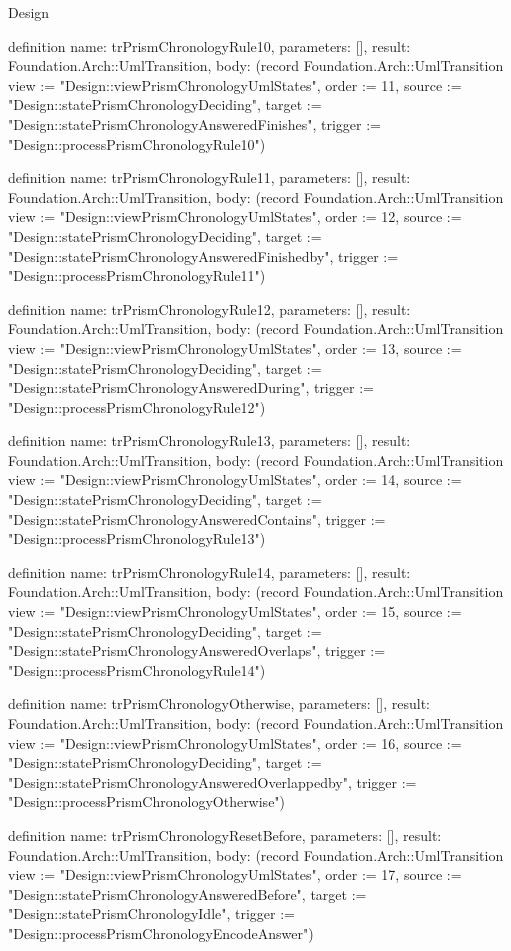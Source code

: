 \begin{lexlean}{Design}
\begin{semanticmodule}
definition{
  name: trPrismChronologyRule10,
  parameters: [],
  result: Foundation.Arch::UmlTransition,
  body: (record Foundation.Arch::UmlTransition {view := "Design::viewPrismChronologyUmlStates", order := 11, source := "Design::statePrismChronologyDeciding", target := "Design::statePrismChronologyAnsweredFinishes", trigger := "Design::processPrismChronologyRule10"})
}

definition{
  name: trPrismChronologyRule11,
  parameters: [],
  result: Foundation.Arch::UmlTransition,
  body: (record Foundation.Arch::UmlTransition {view := "Design::viewPrismChronologyUmlStates", order := 12, source := "Design::statePrismChronologyDeciding", target := "Design::statePrismChronologyAnsweredFinishedby", trigger := "Design::processPrismChronologyRule11"})
}

definition{
  name: trPrismChronologyRule12,
  parameters: [],
  result: Foundation.Arch::UmlTransition,
  body: (record Foundation.Arch::UmlTransition {view := "Design::viewPrismChronologyUmlStates", order := 13, source := "Design::statePrismChronologyDeciding", target := "Design::statePrismChronologyAnsweredDuring", trigger := "Design::processPrismChronologyRule12"})
}

definition{
  name: trPrismChronologyRule13,
  parameters: [],
  result: Foundation.Arch::UmlTransition,
  body: (record Foundation.Arch::UmlTransition {view := "Design::viewPrismChronologyUmlStates", order := 14, source := "Design::statePrismChronologyDeciding", target := "Design::statePrismChronologyAnsweredContains", trigger := "Design::processPrismChronologyRule13"})
}

definition{
  name: trPrismChronologyRule14,
  parameters: [],
  result: Foundation.Arch::UmlTransition,
  body: (record Foundation.Arch::UmlTransition {view := "Design::viewPrismChronologyUmlStates", order := 15, source := "Design::statePrismChronologyDeciding", target := "Design::statePrismChronologyAnsweredOverlaps", trigger := "Design::processPrismChronologyRule14"})
}

definition{
  name: trPrismChronologyOtherwise,
  parameters: [],
  result: Foundation.Arch::UmlTransition,
  body: (record Foundation.Arch::UmlTransition {view := "Design::viewPrismChronologyUmlStates", order := 16, source := "Design::statePrismChronologyDeciding", target := "Design::statePrismChronologyAnsweredOverlappedby", trigger := "Design::processPrismChronologyOtherwise"})
}

definition{
  name: trPrismChronologyResetBefore,
  parameters: [],
  result: Foundation.Arch::UmlTransition,
  body: (record Foundation.Arch::UmlTransition {view := "Design::viewPrismChronologyUmlStates", order := 17, source := "Design::statePrismChronologyAnsweredBefore", target := "Design::statePrismChronologyIdle", trigger := "Design::processPrismChronologyEncodeAnswer"})
}


\end{semanticmodule}
\end{lexlean}
